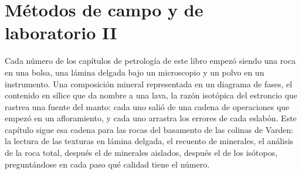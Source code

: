 \chapter{Métodos de campo y de laboratorio II}\label{ch:b2:field-lab-methods-2}

Cada número de los capítulos de petrología de este libro empezó siendo una roca en una bolsa, una lámina delgada bajo un
microscopio y un polvo en un instrumento. Una composición mineral representada en un diagrama de fases, el
contenido en sílice que da nombre a una lava, la razón isotópica del estroncio que rastrea una fuente del manto: cada uno
salió de una cadena de operaciones que empezó en un afloramiento, y cada uno arrastra los errores de cada
eslabón. Este capítulo sigue esa cadena para las rocas del basamento de las colinas de Varden: la lectura de las texturas
en lámina delgada, el recuento de minerales, el análisis de la roca total, después el de minerales aislados, después el de los isótopos,
preguntándose en cada paso qué calidad tiene el número.

